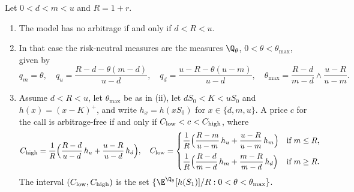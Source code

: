 \begin{proposition}\label{prop:bin-trinomial}
Let $0<d<m<u$ and $R=1+r$.
\begin{enumerate}[label=(\roman*)]
  \item The model has no arbitrage if and only if $d<R<u$.
  \item In that case the risk-neutral measures are the measures $\Q_\theta$,
    $0<\theta<\theta_{\max}$, given by
    \[
      q_m=\theta,\quad q_u=\frac{R-d-\theta(m-d)}{u-d},\quad
      q_d=\frac{u-R-\theta(u-m)}{u-d},\quad
      \theta_{\max}=\frac{R-d}{m-d}\wedge\frac{u-R}{u-m}.
    \]
  \item Assume $d<R<u$, let $\theta_{\max}$ be as in (ii), let $dS_0<K<uS_0$ and
    $h(x)=(x-K)^+$, and write $h_x=h(xS_0)$ for $x\in\{d,m,u\}$. A price $c$ for the
    call is arbitrage-free if and only if
    $C_{\rm low}<c<C_{\rm high}$, where
    \[
      C_{\rm high}=\frac1R\Big(\frac{R-d}{u-d}\,h_u+\frac{u-R}{u-d}\,h_d\Big),\quad
      C_{\rm low}=\begin{cases}
        \dfrac1R\Big(\dfrac{R-m}{u-m}\,h_u+\dfrac{u-R}{u-m}\,h_m\Big) & \text{if } m\le R,\\[2ex]
        \dfrac1R\Big(\dfrac{R-d}{m-d}\,h_m+\dfrac{m-R}{m-d}\,h_d\Big) & \text{if } m\ge R.
      \end{cases}
    \]
    The interval $(C_{\rm low},C_{\rm high})$ is the set
    $\{\E^{\Q_\theta}[h(S_1)]/R:0<\theta<\theta_{\max}\}$.
\end{enumerate}
\end{proposition}

